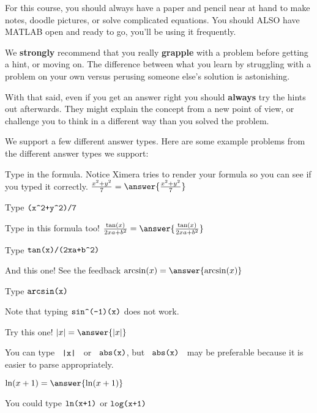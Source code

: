 \documentclass{ximera}
\begin{document}
For this course, you should always have a paper and pencil near at
hand to make notes, doodle pictures, or solve complicated equations. You should ALSO have MATLAB open and ready to go, you'll be using it frequently. 

We \textbf{strongly} recommend that you really \textbf{grapple} with a
problem before getting a hint, or moving on.  The difference between
what you learn by struggling with a problem on your own versus
perusing someone else's solution is astonishing.
 
With that said, even if you get an answer right you should
\textbf{always} try the hints out afterwards.  They might explain the
concept from a new point of view, or challenge you to think in a
different way than you solved the problem.
 
 
We support a few different answer types. Here are some example
problems from the different answer types we support:
 
\begin{example} Type in the formula. Notice Ximera tries to render your formula so you can see if you typed it correctly.
  $\frac{x^2+y^2}{7} = \answer{\frac{x^2+y^2}{7}}$
  \begin{feedback}
    Type $\verb|(x^2+y^2)/7|$
  \end{feedback}
\end{example}
 
\begin{example} Type in this formula too!
  $\frac{\tan(x)}{2xa+b^2} = \answer{\frac{\tan(x)}{2xa+b^2} }$
  \begin{feedback}
    Type $\verb|tan(x)/(2xa+b^2)|$
  \end{feedback}
\end{example}
 
\begin{example} And this one! See the feedback
  $\arcsin(x) = \answer{\arcsin(x)}$
  \begin{feedback}
    Type $\verb|arcsin(x)|$
 
    Note that typing $\verb|sin^(-1)(x)|$ does not work.
  \end{feedback}
\end{example}
 
\begin{example} Try this one!
  $|x| = \answer{|x|}$
  \begin{feedback}
    You can type $\verb! |x| !$ or $\verb! abs(x)!$, but
    $\verb! abs(x) !$ may be preferable because it is easier to parse
    appropriately.
  \end{feedback}
\end{example}
\begin{example}
  $\ln(x+1)= \answer{\ln(x+1)}$
  \begin{feedback}
    You could type $\verb|ln(x+1)|$ or $\verb|log(x+1)|$
  \end{feedback}
\end{example}
 
\end{document}
